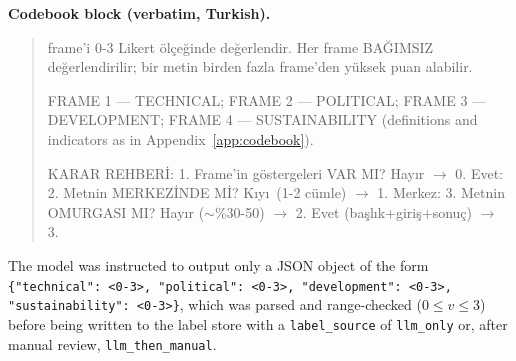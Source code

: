 \noindent\textbf{Codebook block (verbatim, Turkish).}
\begin{quote}\footnotesize{} frame'i 0-3 Likert \"ol\c{c}e\u{g}inde de\u{g}erlendir. Her frame BA\u{G}IMSIZ
de\u{g}erlendirilir; bir metin birden fazla frame'den y\"uksek puan alabilir.

FRAME 1 --- TECHNICAL; FRAME 2 --- POLITICAL; FRAME 3 --- DEVELOPMENT;
FRAME 4 --- SUSTAINABILITY (definitions and indicators as in
Appendix~\ref{app:codebook}).

KARAR REHBER\.{I}:
1. Frame'in g\"ostergeleri VAR MI? Hay\i r $\rightarrow$ 0. Evet:
2. Metnin MERKEZ\.{I}NDE M\.{I}? K\i y\i\ (1-2 c\"umle) $\rightarrow$ 1. Merkez:
3. Metnin OMURGASI MI? Hay\i r ($\sim$\%30-50) $\rightarrow$ 2.
   Evet (ba\c{s}l\i k+giri\c{s}+sonu\c{c}) $\rightarrow$ 3.
\end{quote}

\noindent The model was instructed to output only a JSON object of the form
\texttt{\{"technical": <0-3>, "political": <0-3>, "development": <0-3>,
"sustainability": <0-3>\}}, which was parsed and range-checked
(0$\le v \le$3) before being written to the label store with a
\texttt{label\_source} of \texttt{llm\_only} or, after manual review,
\texttt{llm\_then\_manual}.
